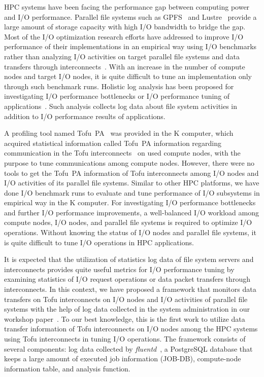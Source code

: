 \documentclass{jhps}
\begin{document}
HPC systems have been facing the performance gap between computing power and I/O performance.
Parallel file systems such as GPFS~\cite{gpfs:usenix02} and Lustre~\cite{lustre:web} provide
a large amount of storage capacity with high I/O bandwidth to bridge the gap.
Most of the I/O optimization research efforts have addressed to improve
I/O performance of their implementations in an empirical way using I/O benchmarks
rather than analyzing I/O activities on target parallel file systems
and data transfers
through interconnects~\cite{behzad:sc13,bhimji:cug16,tessier:com-hpc16,vazhkudai:sc18,oral:sc19}.
With an increase in the number of compute nodes and target I/O nodes,
it is quite difficult to tune an implementation only through such benchmark runs.
Holistic log analysis has been proposed for investigating I/O performance bottlenecks
or I/O performance tuning
of applications~\cite{lockwood:cug18,wang:cluster18,yang:nsdi2019}.
Such analysis collects log data about file system activities in addition to
I/O performance results of applications.

A profiling tool named Tofu~PA~\cite{profiler:fujitsu-tech-si} was provided
in the K computer, which acquired statistical information called Tofu~PA information
regarding communication in the Tofu interconnects~\cite{tofu:micro2012}
on used compute nodes, with the purpose to tune communications among compute nodes.
However, there were no tools to get the Tofu~PA information of Tofu interconnects
among I/O nodes and I/O activities of its parallel file systems.
Similar to other HPC platforms, we have done I/O benchmark runs
to evaluate and tune performance of I/O subsystems in empirical way
in the K computer.
For investigating I/O performance bottlenecks and further I/O performance improvements,
a well-balanced I/O workload among compute nodes, I/O nodes, and parallel file systems
is required to optimize I/O operations.
Without knowing the status of I/O nodes and parallel file systems,
it is quite difficult to tune I/O operations in HPC applications.

It is expected that the utilization of statistics log data of file system servers and
interconnects provides quite useful metrics for I/O performance tuning by examining statistics
of I/O request operations or data packet transfers through interconnects.
In this context, we have proposed a framework that monitors data transfers
on Tofu interconnects on I/O nodes and I/O activities of parallel file systems
with the help of log data collected in the system administration
in our workshop paper~\cite{tsujita:hpc_iodc20}.
To our best knowledge, this is the first work to utilize data transfer information of
Tofu interconnects on I/O nodes among the HPC systems using Tofu interconnects
in tuning I/O operations.
The framework consists of several components: log data collected by
{\itshape fluentd}~\cite{fluentd:web}, a PostgreSQL database that keeps a large amount
of executed job information (JOB-DB),
compute-node information table, and analysis function.
\end{document}
